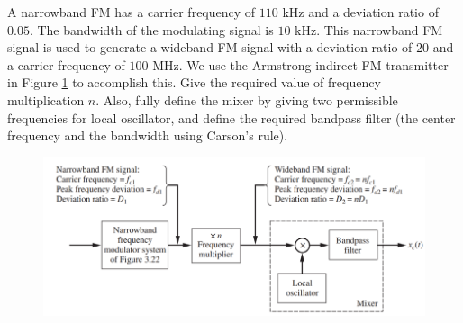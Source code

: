 \documentclass{assignment}
\begin{document}
\begin{prob}
    A narrowband FM has a carrier frequency of $110$ kHz and a deviation ratio of $0.05$. The bandwidth of the modulating signal is $10$ kHz. This narrowband FM signal is used to generate a wideband FM signal with a deviation ratio of $20$ and a carrier frequency of $100$ MHz. We use the Armstrong indirect FM transmitter in Figure \ref{A-5-P-5} to accomplish this. Give the required value of frequency multiplication $n$. Also, fully define the mixer by giving two permissible frequencies for local oscillator, and define the required bandpass filter (the center frequency and the bandwidth using Carson's rule).
    \begin{figure}[h]
        \centering
        \includegraphics[width=.8\columnwidth]{Assignment-5-Problem-5.png}
        \caption{}
        \label{A-5-P-5}
    \end{figure}
\end{prob}
\end{document}
